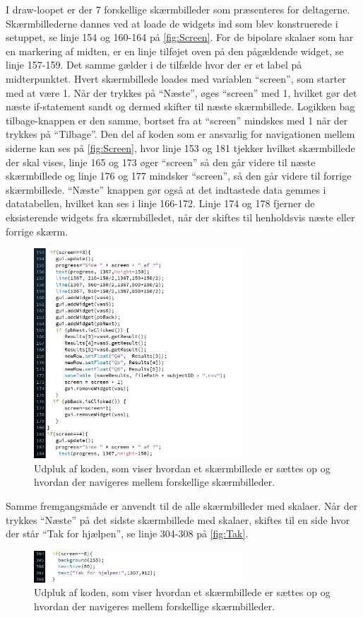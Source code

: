 I draw-loopet er der 7 forskellige skærmbilleder som præsenteres for deltagerne. Skærmbillederne dannes ved at loade de widgets ind som blev konstruerede i setuppet, se linje 154 og 160-164 på \autoref{fig:Screen}. For de bipolare skalaer som har en markering af midten, er en linje tilføjet oven på den pågældende widget, se linje 157-159. Det samme gælder i de tilfælde hvor der er et label på midterpunktet. 
Hvert skærmbillede loades med variablen ``screen'', som starter med at være 1. Når der trykkes på ``Næste'', øges ``screen'' med 1, hvilket gør det næste if-statement sandt og dermed skifter til næste skærmbillede. Logikken bag tilbage-knappen er den samme, bortset fra at ``screen'' mindskes med 1 når der trykkes på ``Tilbage''. Den del af koden som er ansvarlig for navigationen mellem siderne kan ses på \autoref{fig:Screen}, hvor linje 153 og 181 tjekker hvilket skærmbillede der skal vises, linje 165 og 173 øger ``screen'' så den går videre til næste skærmbillede og linje 176 og 177 mindsker ``screen'', så den går videre til forrige skærmbillede.
``Næste'' knappen gør også at det indtastede data gemmes i datatabellen, hvilket kan ses i linje 166-172. Linje 174 og 178 fjerner de eksisterende widgets fra skærmbilledet, når der skiftes til henholdsvis næste eller forrige skærm.
\begin{figure}[H]
\centering
\includegraphics[width =0.7\textwidth]{Figure/VASProgram/Screen} 
\caption{Udpluk af koden, som viser hvordan et skærmbillede er sættes op og hvordan der navigeres mellem forskellige skærmbilleder.}
\label{fig:Screen}
\end{figure}
\noindent
%
Samme fremgangsmåde er anvendt til de alle skærmbilleder med skalaer. Når der trykkes ``Næste'' på det sidste skærmbillede med skalaer, skiftes til en side hvor der står ``Tak for hjælpen'', se linje 304-308 på \autoref{fig:Tak}.
\begin{figure}[H]
\centering
\includegraphics[width =0.7\textwidth]{Figure/VASProgram/Tak} 
\caption{Udpluk af koden, som viser hvordan et skærmbillede er sættes op og hvordan der navigeres mellem forskellige skærmbilleder.}
\label{fig:Tak}
\end{figure}
\noindent
%

